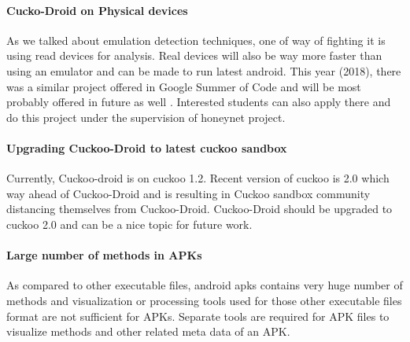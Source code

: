 \documentclass[../main.tex]{subfile}
\begin{document}
\paragraph{Cucko-Droid on Physical devices} As we talked about emulation detection techniques, one of way of fighting it is using read devices for analysis. Real devices will also be way more faster than using an emulator and can be made to run latest android. This year (2018), there was a similar project offered in Google Summer of Code and will be most probably offered in future as well \cite{honeynet_gsoc_project}. Interested students can also apply there and do this project under the supervision of honeynet project.

\paragraph{Upgrading Cuckoo-Droid to latest cuckoo sandbox} Currently, Cuckoo-droid is on cuckoo 1.2. Recent version of cuckoo is 2.0 which way ahead of Cuckoo-Droid and is resulting in Cuckoo sandbox community distancing themselves from Cuckoo-Droid. Cuckoo-Droid should be upgraded to cuckoo 2.0 and can be a nice topic for future work.

\paragraph{Large number of methods in APKs} As compared to other executable files, android apks contains very huge number of methods and visualization or processing tools used for those other executable files format are not sufficient for APKs. Separate tools are required for APK files to visualize methods and other related meta data of an APK.
\end{document}
